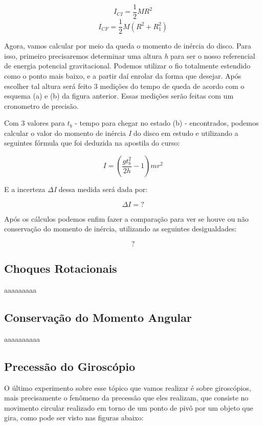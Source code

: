 \[I_{CI} = \frac{1}{2}MR^2\]
\[I_{CF} = \frac{1}{2}M(R^2 + R_1^2)\]

Agora, vamos calcular por meio da queda o momento de inércia do disco. Para isso, primeiro precisaremos determinar uma altura \textit{h} para ser o nosso referencial de energia potencial gravitacional. Podemos utilizar o fio totalmente estendido como o ponto mais baixo, e a partir daí enrolar da forma que desejar. Após escolher tal altura será feito 3 medições do tempo de queda de acordo com o esquema (a) e (b) da figura anterior. Essas medições serão feitas com um cronometro de precisão.

Com 3 valores para \textit{$t_b$} - tempo para chegar no estado (b) - encontrados, podemos calcular o valor do momento de inércia \textit{I} do disco em estudo e utilizando a seguintes fórmula que foi deduzida na apostila do curso:

\[I = \left( \frac{gt_b^2}{2h} - 1 \right) mr^2\]

E a incerteza \textit{$\Delta$I} dessa medida será dada por:

\[\Delta I = ?\]

Após os cálculos podemos enfim fazer a comparação para ver se houve ou não conservação do momento de inércia, utilizando as seguintes desigualdades:

\[?\]


\subsection{Choques Rotacionais}

aaaaaaaaa


\subsection{Conservação do Momento Angular}

aaaaaaaaaa


\subsection{Precessão do Giroscópio}

O último experimento sobre esse tópico que vamos realizar é sobre giroscópios, mais precisamente o fenômeno da precessão que eles realizam, que consiste no movimento circular realizado em torno de um ponto de pivô por um objeto que gira, como pode ser visto nas figuras abaixo:


